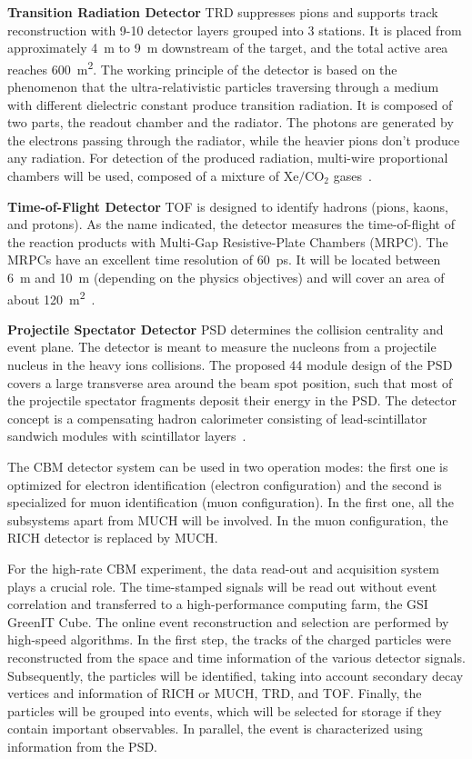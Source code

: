 \textbf{Transition Radiation Detector} \gls{TRD} suppresses pions and  supports track reconstruction with 9-10 detector layers grouped into 3 stations. It is placed from approximately \SI{4}{\metre} to \SI{9}{\metre} downstream of the target, and the total active area reaches \SI{600}{\square\metre}. The working principle of the detector is based on the phenomenon that the ultra-relativistic particles traversing through a medium with different dielectric constant produce transition radiation. It is composed of two parts, the readout chamber and the radiator. The photons are generated by the electrons passing through the radiator, while the heavier pions don't produce any radiation. For detection of the produced radiation, multi-wire proportional chambers will be used, composed of a mixture of $\mathrm{Xe/CO_{2}}$ gases~\cite{TRD}. \bigbreak

\textbf{Time-of-Flight Detector} \gls{TOF} is designed to identify hadrons (pions, kaons, and protons). As the name indicated, the detector measures the time-of-flight of the reaction products with Multi-Gap Resistive-Plate Chambers (\gls{MRPC}). The \glspl{MRPC} have an excellent time resolution of \SI{60}{\pico\second}.  It will be located between \SI{6}{\metre} and \SI{10}{\metre} (depending on the physics objectives) and will cover an area of about \SI{120}{\square\metre}~\cite{TOF}. \bigbreak

\textbf{Projectile Spectator Detector} \gls{PSD} determines the collision centrality and event plane. The detector is meant to measure the nucleons from a projectile nucleus in the heavy ions collisions. The proposed 44 module design of the PSD covers a large transverse area around the beam spot position, such that most of the projectile spectator fragments deposit their energy in the \gls{PSD}. The detector concept is a compensating hadron calorimeter consisting of lead-scintillator sandwich modules with scintillator layers~\cite{PSD}.\bigbreak


The CBM detector system can be used in two operation modes: the first one is optimized for electron identification (electron configuration) and the second is specialized for muon identification (muon configuration). In the first one, all the subsystems apart from MUCH will be involved. In the muon configuration, the \gls{RICH} detector is replaced by \gls{MUCH}.

For the high-rate CBM experiment, the data read-out and acquisition system plays a crucial role. The time-stamped signals will be read out without event correlation and transferred to a high-performance computing farm, the GSI GreenIT Cube. The online event reconstruction and selection are performed by high-speed algorithms. In the first step, the tracks of the charged particles were reconstructed from the space and time information of the various detector signals. Subsequently, the particles will be identified, taking into account secondary decay vertices and information of \gls{RICH} or \gls{MUCH}, \gls{TRD}, and \gls{TOF}. Finally, the particles will be grouped into events, which will be selected for storage if they contain important observables. In parallel, the event is characterized using information from the PSD.


